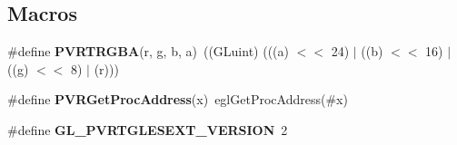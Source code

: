 \subsection*{Macros}
\begin{DoxyCompactItemize}
\item 
\hypertarget{group___a_p_i___o_g_l_e_s2_gae648106645c725cd951e175cca412570}{\#define {\bfseries P\+V\+R\+T\+R\+G\+B\+A}(r, g, b, a)~((G\+Luint) (((a) $<$$<$ 24) $\vert$ ((b) $<$$<$ 16) $\vert$ ((g) $<$$<$ 8) $\vert$ (r)))}\label{group___a_p_i___o_g_l_e_s2_gae648106645c725cd951e175cca412570}

\item 
\hypertarget{group___a_p_i___o_g_l_e_s2_ga4d75a8396541a8b002cc3b1b4f292604}{\#define {\bfseries P\+V\+R\+Get\+Proc\+Address}(x)~egl\+Get\+Proc\+Address(\#x)}\label{group___a_p_i___o_g_l_e_s2_ga4d75a8396541a8b002cc3b1b4f292604}

\item 
\hypertarget{group___a_p_i___o_g_l_e_s2_ga2eb4395839440f4db904a0cd3c6061f4}{\#define {\bfseries G\+L\+\_\+\+P\+V\+R\+T\+G\+L\+E\+S\+E\+X\+T\+\_\+\+V\+E\+R\+S\+I\+O\+N}~2}\label{group___a_p_i___o_g_l_e_s2_ga2eb4395839440f4db904a0cd3c6061f4}

\end{DoxyCompactItemize}
